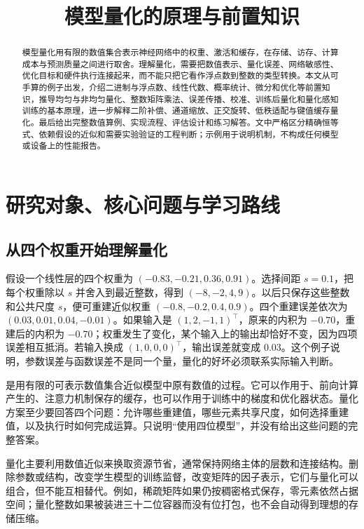\documentclass[UTF8,12pt,a4paper,fontset=fandol]{ctexart}
\title{模型量化的原理与前置知识}
\author{}
\date{}
\begin{document}
\maketitle

\begin{abstract}
模型量化用有限的数值集合表示神经网络中的权重、激活和缓存，在存储、访存、计算成本与预测质量之间进行取舍。理解量化，需要把数值表示、量化误差、网络敏感性、优化目标和硬件执行连接起来，而不能只把它看作浮点数到整数的类型转换。本文从可手算的例子出发，介绍二进制与浮点数、线性代数、概率统计、微分和优化等前置知识，推导均匀与非均匀量化、整数矩阵乘法、误差传播、校准、训练后量化和量化感知训练的基本原理，进一步解释二阶补偿、通道缩放、正交旋转、低秩适配与键值缓存量化。最后给出完整数值算例、实现流程、评估设计和练习解答。文中严格区分精确恒等式、依赖假设的近似和需要实验验证的工程判断；示例用于说明机制，不构成任何模型或设备上的性能报告。
\end{abstract}
\tableofcontents

\section{研究对象、核心问题与学习路线}
\label{sec:quant-intro}

\subsection{从四个权重开始理解量化}
假设一个线性层的四个权重为 $(-0.83,-0.21,0.36,0.91)$。选择间距 $s=0.1$，把每个权重除以 $s$ 并舍入到最近整数，得到 $(-8,-2,4,9)$。以后只保存这些整数和公共尺度 $s$，便可重建近似权重 $(-0.8,-0.2,0.4,0.9)$。四个重建误差依次为 $(0.03,0.01,0.04,-0.01)$。如果输入是 $(1,2,-1,1)^\top$，原来的内积为 $-0.70$，重建后的内积为 $-0.70$；权重发生了变化，某个输入上的输出却恰好不变，因为四项误差相互抵消。若输入换成 $(1,0,0,0)^\top$，输出误差就变成 $0.03$。这个例子说明，参数误差与函数误差不是同一个量，量化的好坏必须联系实际输入判断。

是用有限的可表示数值集合近似模型中原有数值的过程。它可以作用于、前向计算产生的、注意力机制保存的缓存，也可以作用于训练中的梯度和优化器状态。量化方案至少要回答四个问题：允许哪些重建值，哪些元素共享尺度，如何选择重建值，以及执行时如何完成运算。只说明“使用四位模型”，并没有给出这些问题的完整答案。

量化主要利用数值近似来换取资源节省，通常保持网络主体的层数和连接结构。删除参数或结构，改变学生模型的训练监督，改变矩阵的因子表示，它们与量化可以组合，但不能互相替代。例如，稀疏矩阵如果仍按稠密格式保存，零元素依然占据空间；量化整数如果被装进三十二位容器而没有位打包，也不会自动得到理想的存储压缩。
\end{document}
